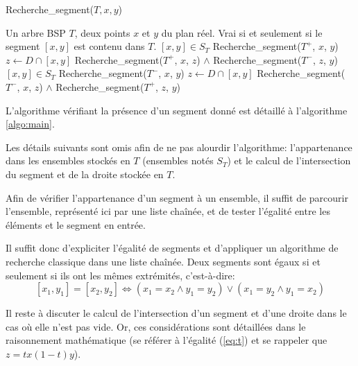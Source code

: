 
\begin{algorithm}
  \caption{Recherche\_segment($T, x, y$)}
  \begin{algorithmic}[1] \label{algo:main}
    \REQUIRE Un arbre BSP $T$, deux points $x$ et $y$ du plan réel.
    \ENSURE Vrai si et seulement si le segment $[x, y]$ est contenu dans $T$.
    \RETURN $[x, y]\in S_T$
    \ENDIF
      \RETURN Recherche\_segment($T^+$, $x$, $y$)
      \ELSE
      \STATE $z \leftarrow D \cap [x, y]$
      \RETURN Recherche\_segment($T^+$, $x$, $z$) $\land$ Recherche\_segment($T^-$, $z$, $y$)
      \ENDIF
      \ELSE
      \RETURN $[x, y]\in S_T$
      \RETURN Recherche\_segment($T^-$, $x$, $y$)
      \ELSE
      \STATE $z \leftarrow D \cap [x, y]$
      \RETURN Recherche\_segment($T^-$, $x$, $z$) $\land$ Recherche\_segment($T^+$, $z$, $y$)
      \ENDIF
    \ENDIF
  \end{algorithmic}
\end{algorithm}

L'algorithme vérifiant la présence d'un segment donné est détaillé à
l'algorithme \ref{algo:main}.

Les détails suivants sont omis afin de ne pas alourdir l'algorithme:
l'appartenance dans les ensembles stockés en $T$ (ensembles notés
$S_T$) et le calcul de l'intersection du segment et de la
droite stockée en $T$.

Afin de vérifier l'appartenance d'un segment à un ensemble, il
suffit de parcourir l'ensemble, représenté ici par une liste
chaînée, et de tester l'égalité entre les éléments et le segment
en entrée.

Il suffit donc d'expliciter l'égalité de segments et d'appliquer
un algorithme de recherche classique dans une liste chaînée.
Deux segments sont égaux si et seulement si ils ont les
mêmes extrémités, c'est-à-dire:
$$ [x_1, y_1] = [x_2, y_2] \iff
(x_1 = x_2 \land y_1 = y_2) \lor (x_1 = y_2 \land y_1 = x_2) $$

Il reste à discuter le calcul de l'intersection d'un segment
et d'une droite dans le cas où elle n'est pas vide. Or, ces
considérations sont détaillées dans le raisonnement mathématique
(se référer à l'égalité (\ref{eq:t}) et se rappeler que $z = tx (1-t) y$).
